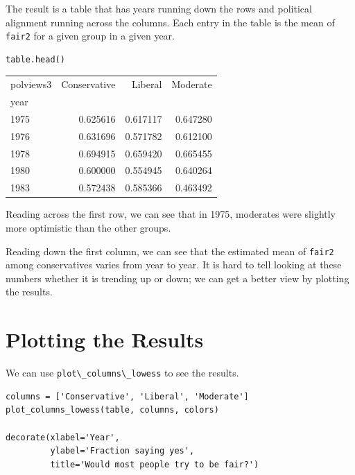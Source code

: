 The result is a table that has years running down the rows and political
alignment running across the columns. Each entry in the table is the
mean of \passthrough{\lstinline!fair2!} for a given group in a given
year.

\begin{lstlisting}[]
table.head()
\end{lstlisting}

\begin{tabular}{lrrr}
\midrule
polviews3 &  Conservative &   Liberal &  Moderate \\
year &               &           &           \\
\midrule
1975 &      0.625616 &  0.617117 &  0.647280 \\
1976 &      0.631696 &  0.571782 &  0.612100 \\
1978 &      0.694915 &  0.659420 &  0.665455 \\
1980 &      0.600000 &  0.554945 &  0.640264 \\
1983 &      0.572438 &  0.585366 &  0.463492 \\
\midrule
\end{tabular}

Reading across the first row, we can see that in 1975, moderates were
slightly more optimistic than the other groups.

Reading down the first column, we can see that the estimated mean of
\passthrough{\lstinline!fair2!} among conservatives varies from year to
year. It is hard to tell looking at these numbers whether it is trending
up or down; we can get a better view by plotting the results.

\hypertarget{plotting-the-results}{%
\section{Plotting the Results}\label{plotting-the-results}}

We can use \passthrough{\lstinline!plot\_columns\_lowess!} to see the
results.

\begin{lstlisting}[]
columns = ['Conservative', 'Liberal', 'Moderate']
plot_columns_lowess(table, columns, colors)

decorate(xlabel='Year',
         ylabel='Fraction saying yes',
         title='Would most people try to be fair?')
\end{lstlisting}

